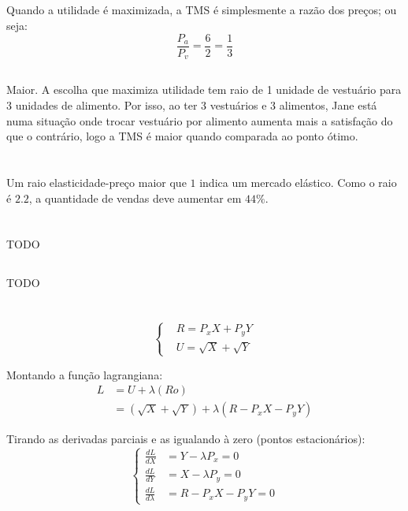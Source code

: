 \documentclass{article}
\begin{document}
\subsection{}
Quando a utilidade é maximizada, a TMS é simplesmente a razão dos preços; ou seja:
\[
	\frac{P_a}{P_v} = \frac{6}{2} = \frac{1}{3}
\]

\subsection{}
Maior. A escolha que maximiza utilidade tem raio de 1 unidade de vestuário para 3 unidades de alimento. Por isso, ao ter 3 vestuários e 3 alimentos, Jane está numa situação onde trocar vestuário por alimento aumenta mais a satisfação do que o contrário, logo a TMS é maior quando comparada ao ponto ótimo.

\section{}
Um raio elasticidade-preço maior que \(1\) indica um mercado elástico. Como o raio é \(2.2\), a quantidade de vendas deve aumentar em \(44\%\).

\section{}
\subsection{}
TODO
\subsection{}
TODO

\section{}
\subsection{}

\[
	\left\{
	\begin{aligned}
		 & R = P_x X + P_y Y       \\
		 & U = \sqrt{X} + \sqrt{Y}
	\end{aligned}
	\right.
\]

Montando a função lagrangiana:
\[
	\begin{aligned}
		L & = U + \lambda(Ro)                                    \\
		  & = (\sqrt{X} + \sqrt{Y}) + \lambda(R - P_x X - P_y Y)
	\end{aligned}
\]

Tirando as derivadas parciais e as igualando à zero (pontos estacionários):
\[
	\left\{
	\begin{aligned}
		\frac{dL}{dX}       & = Y - \lambda P_x = 0   \\
		\frac{dL}{dY}       & = X - \lambda P_y = 0   \\
		\frac{dL}{d\lambda} & = R - P_x X - P_y Y = 0
	\end{aligned}
	\right.
\]
\end{document}
